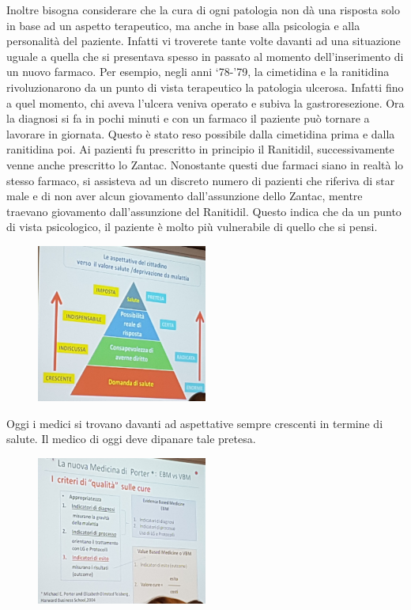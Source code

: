 Inoltre bisogna considerare che la cura di ogni patologia non dà una
risposta solo in base ad un aspetto terapeutico, ma anche in base alla
psicologia e alla personalità del paziente. Infatti vi troverete tante
volte davanti ad una situazione uguale a quella che si presentava spesso
in passato al momento dell'inserimento di un nuovo farmaco. Per esempio,
negli anni `78-'79, la cimetidina e la ranitidina rivoluzionarono da un
punto di vista terapeutico la patologia ulcerosa. Infatti fino a quel
momento, chi aveva l'ulcera veniva operato e subiva la gastroresezione.
Ora la diagnosi si fa in pochi minuti e con un farmaco il paziente può
tornare a lavorare in giornata. Questo è stato reso possibile dalla
cimetidina prima e dalla ranitidina poi. Ai pazienti fu prescritto in
principio il Ranitidil, successivamente venne anche prescritto lo
Zantac. Nonostante questi due farmaci siano in realtà lo stesso farmaco,
si assisteva ad un discreto numero di pazienti che riferiva di star male
e di non aver alcun giovamento dall'assunzione dello Zantac, mentre
traevano giovamento dall'assunzione del Ranitidil. Questo indica che da
un punto di vista psicologico, il paziente è molto più vulnerabile di
quello che si pensi.

\begin{figure}[!ht]
\centering
	\includegraphics[width=0.5\textwidth]{29/image2.jpeg}
	\end{figure}

Oggi
i medici si trovano davanti ad aspettative sempre crescenti in termine
di salute. Il medico di oggi deve dipanare tale pretesa.

\begin{figure}[!ht]
\centering
	\includegraphics[width=0.5\textwidth]{29/image3.jpeg}
	\end{figure}

